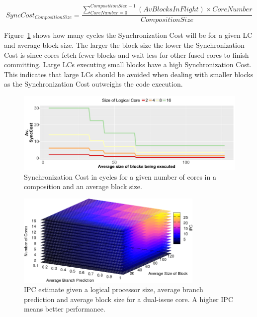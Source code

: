 \begin{equation}\label{form:synccost}
SyncCost_{CompositionSize} = \frac{\sum_{CoreNumber=0}^{CompositionSize-1}\left(AvBlocksInFlight \right) \times CoreNumber }{CompositionSize}
\end{equation}


Figure~\ref{fig:sync_cost} shows how many cycles the Synchronization Cost will be for a given LC and average block size.
The larger the block size the lower the Synchronization Cost is since cores fetch fewer blocks and wait less for other fused cores to finish committing.
Large LCs executing small blocks have a high Synchronization Cost. 
This indicates that large LCs should be avoided when dealing with smaller blocks as the Synchronization Cost outweighs the code execution.

\begin{figure}[t]
    \centering
    \includegraphics[width=\textwidth]{cases-paper/graphics/limit_study/sync_cost.pdf}

    \caption{Synchronization Cost in cycles for a given number of cores in a composition and an average block size.} %
    \label{fig:sync_cost}
	\vspace{1em}
\end{figure}

\begin{figure}[t]
    \centering
    \includegraphics[width=0.8\textwidth]{cases-paper/graphics/limit_study/summary.pdf}
    \caption{IPC estimate given a logical processor size, average branch prediction and average block size for a dual-issue core. A higher IPC means better performance.}
    \label{fig:lm_summ}
\vspace{5mm}
\end{figure}

